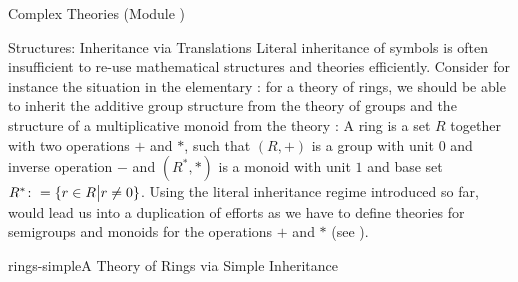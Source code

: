 \begin{tchapter}[id=complex-theories,short=Complex Theories]{Complex Theories (Module
    )}
\begin{tsection}[id=morphisms]{Structures: Inheritance via Translations}
  Literal inheritance of symbols is often insufficient to re-use mathematical structures
  and theories efficiently. Consider for instance the situation in the elementary
  : for a theory of rings, we should be able to inherit
  the additive group structure from the theory  of groups and the
  structure of a multiplicative monoid from the theory : A ring is a set
  $R$ together with two operations $+$ and $*$, such that $(R,+)$ is a group with unit $0$
  and inverse operation $-$ and $(R^*,*)$ is a monoid with unit $1$ and base set
  $R^*\colon=\{r\in R\bigl|r\ne 0\}$.  Using the literal inheritance regime introduced so
  far, would lead us into a duplication of efforts as we have to define theories for
  semigroups and monoids for the operations $+$ and $*$ (see ).
\begin{myfig}{rings-simple}{A Theory of Rings via Simple Inheritance}
\end{myfig}
\end{tsection}
\end{tchapter}
